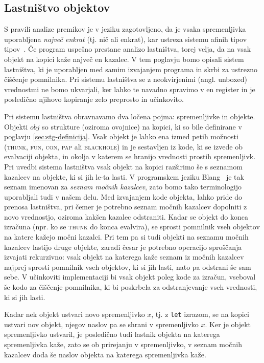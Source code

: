 \subsection{Lastništvo objektov}

S pravili analize premikov je v jeziku zagotovljeno, da je vsaka spremenljivka uporabljena \emph{največ enkrat} (tj. nič ali enkrat), kar ustreza sistemu afinih tipov tipov~\cite{pierce2004advanced}. Če program uspešno prestane analizo lastništva, torej velja, da na vsak objekt na kopici kaže naj\-več en kazalec. V tem poglavju bomo opisali sistem lastništva, ki je uporabljen med samim izvajanjem programa in skrbi za ustrezno čiščenje pomnilnika. Pri sistemu lastništva se z neokvirjenimi (angl. unboxed) vrednostmi ne bomo ukvarjali, ker lahko te navadno spravimo v en register in je posledično njihovo kopiranje zelo preprosto in učinkovito.

Pri sistemu lastništva obravnavamo dva ločena pojma: spremenljivke in objekte. Objekti $obj$ so strukture (oziroma ovojnice) na kopici, ki so bile definirane v poglavju \ref{sec:stg-definicija}. Vsak objekt je lahko ena izmed petih možnosti (\textsc{thunk}, \textsc{fun}, \textsc{con}, \textsc{pap} ali \textsc{blackhole}) in je sestavljen iz kode, ki se izvede ob evalvaciji objekta, in okolja v katerem se hranijo vrednosti prostih spremenljivk. Pri uvedbi sistema lastništva vsak objekt na kopici razširimo še s seznamom kazalcev na objekte, ki si jih le-ta lasti. V programskem jeziku Blang~\cite{turk2022len} je tak  seznam imenovan za \textit{seznam močnih kazalcev}, zato bomo tako terminologijo uporabljali tudi v našem delu. Med izvajanjem kode objekta, lahko pride do prenosa lastništva, pri čemer je potrebno seznam močnih kazalcev dopolniti z novo vrednostjo, oziroma kakšen kazalec odstraniti. Kadar se objekt do konca izračuna (npr. ko se \textsc{thunk} do konca evalvira), se sprosti pomnilnik vseh objektov na katere kažejo močni kazalci. Pri tem pa si tudi objekti na seznamu močnih kazalcev lastijo druge objekte, zaradi česar je potrebno operacijo sproščanja izvajati rekurzivno: vsak objekt na katerega kaže seznam iz močnih kazalcev najprej sprosti pomnilnik vseh objektov, ki si jih lasti, nato pa odstrani še sam sebe. V učinkoviti implementaciji bi vsak objekt poleg kode za izračun, vseboval še kodo za čiščenje pomnilnika, ki bi poskrbela za odstranjevanje vseh vrednosti, ki si jih lasti.

Kadar nek objekt ustvari novo spremenljivko $x$, tj. z \texttt{let} izrazom, se na kopici ustvari nov objekt, njegov naslov pa se shrani v spremenljivko $x$. Ker je objekt spremenljivko ustvaril, je posledično tudi lastnik objekta na katerega spremenljivka kaže, zato se ob prirejanju v spremenljivko, v seznam močnih kazalcev doda še naslov objekta na katerega spremenljivka kaže.

